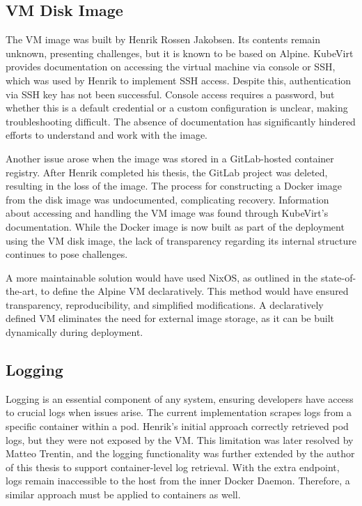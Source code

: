 \subsection{VM Disk Image}
The VM image was built by Henrik Rossen Jakobsen. Its contents remain unknown, presenting challenges, but it is known to be based on Alpine. KubeVirt provides documentation on accessing the virtual machine via console or SSH, which was used by Henrik to implement SSH access. Despite this, authentication via SSH key has not been successful. Console access requires a password, but whether this is a default credential or a custom configuration is unclear, making troubleshooting difficult. The absence of documentation has significantly hindered efforts to understand and work with the image.

Another issue arose when the image was stored in a GitLab-hosted container registry. After Henrik completed his thesis, the GitLab project was deleted, resulting in the loss of the image. The process for constructing a Docker image from the disk image was undocumented, complicating recovery. Information about accessing and handling the VM image was found through KubeVirt's documentation. While the Docker image is now built as part of the deployment using the VM disk image, the lack of transparency regarding its internal structure continues to pose challenges.

A more maintainable solution would have used NixOS, as outlined in the state-of-the-art, to define the Alpine VM declaratively. This method would have ensured transparency, reproducibility, and simplified modifications. A declaratively defined VM eliminates the need for external image storage, as it can be built dynamically during deployment.

\subsection{Logging} 
Logging is an essential component of any system, ensuring developers have access to crucial logs when issues arise. The current implementation scrapes logs from a specific container within a pod. Henrik's initial approach correctly retrieved pod logs, but they were not exposed by the VM. This limitation was later resolved by Matteo Trentin, and the logging functionality was further extended by the author of this thesis to support container-level log retrieval. With the extra endpoint, logs remain inaccessible to the host from the inner Docker Daemon. Therefore, a similar approach must be applied to containers as well.

